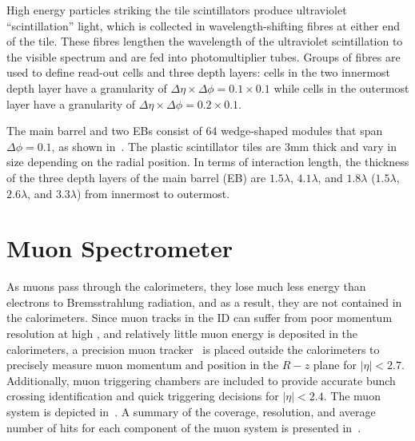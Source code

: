 High energy particles striking the tile scintillators produce ultraviolet ``scintillation'' light, which is collected in wavelength-shifting fibres at either end of the tile. These fibres lengthen the wavelength of the ultraviolet scintillation to the visible spectrum and are fed into photomultiplier tubes. Groups of fibres are used to define read-out cells and three depth layers: cells in the two innermost depth layer have a granularity of $\Delta\eta\times\Delta\phi=0.1\times0.1$ while cells in the outermost layer have a granularity of $\Delta\eta\times\Delta\phi=0.2\times0.1$.

The main barrel and two EBs consist of 64 wedge-shaped modules that span $\Delta\phi=0.1$, as shown in~\Fig{\ref{fig:tilecal}}.  The plastic scintillator tiles are 3mm thick and vary in size depending on the radial position. In terms of interaction length, the thickness of the three depth layers of the main barrel (EB) are $1.5\lambda$, $4.1\lambda$, and $1.8\lambda$ ($1.5\lambda$, $2.6\lambda$, and $3.3\lambda$) from innermost to outermost. 

\section{Muon Spectrometer}
As muons pass through the calorimeters, they lose much less energy than electrons to Bremsstrahlung radiation,
and as a result, they are not contained in the calorimeters.
Since muon tracks in the ID can suffer from poor momentum resolution at high \pt,
and relatively little muon energy is deposited in the calorimeters, a precision muon tracker~\cite{Muon_TDR} is placed outside the calorimeters to precisely measure muon momentum and position in the $R-z$ plane for $|\eta|<2.7$.  Additionally, muon triggering chambers are included to provide accurate bunch crossing identification and quick triggering decisions for $|\eta|<2.4$. The muon system is depicted in~\Fig{\ref{fig:mu_layout}}.  A summary of the coverage, resolution, and average number of hits for each component of the muon system is presented in~\Tab{\ref{tab:muon_cov}}.

